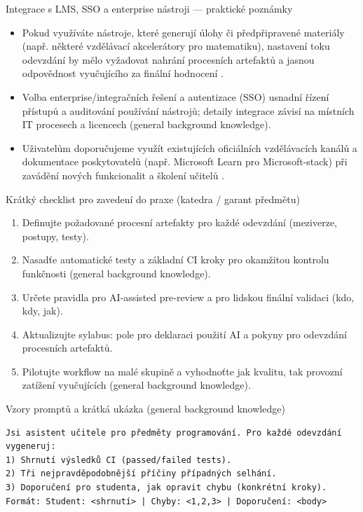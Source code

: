 \documentclass{report}%
\begin{document}
Integrace s LMS, SSO a enterprise nástroji — praktické poznámky
\begin{itemize}
  \item Pokud využíváte nástroje, které generují úlohy či předpřipravené materiály (např. některé vzdělávací akcelerátory pro matematiku), nastavení toku odevzdání by mělo vyžadovat nahrání procesních artefaktů a jasnou odpovědnost vyučujícího za finální hodnocení \cite{kb_ai_101_tipu_pdf_04e4a115_page_8_1}.
  \item Volba enterprise/integračních řešení a autentizace (SSO) usnadní řízení přístupů a auditování používání nástrojů; detaily integrace závisí na místních IT procesech a licencech (general background knowledge).
  \item Uživatelům doporučujeme využít existujících oficiálních vzdělávacích kanálů a dokumentace poskytovatelů (např. Microsoft Learn pro Microsoft‑stack) při zavádění nových funkcionalit a školení učitelů \cite{kb_ai_101_tipu_pdf_04e4a115_page_54_1}.
\end{itemize}

Krátký checklist pro zavedení do praxe (katedra / garant předmětu)
\begin{enumerate}
  \item Definujte požadované procesní artefakty pro každé odevzdání (meziverze, postupy, testy).
  \item Nasadťe automatické testy a základní CI kroky pro okamžitou kontrolu funkčnosti (general background knowledge).
  \item Určete pravidla pro AI‑assisted pre‑review a pro lidskou finální validaci (kdo, kdy, jak).
  \item Aktualizujte sylabus: pole pro deklaraci použití AI a pokyny pro odevzdání procesních artefaktů.
  \item Pilotujte workflow na malé skupině a vyhodnoťte jak kvalitu, tak provozní zatížení vyučujících (general background knowledge).
\end{enumerate}

Vzory promptů a krátká ukázka (general background knowledge)
\begin{verbatim}
Jsi asistent učitele pro předměty programování. Pro každé odevzdání vygeneruj:
1) Shrnutí výsledků CI (passed/failed tests).
2) Tři nejpravděpodobnější příčiny případných selhání.
3) Doporučení pro studenta, jak opravit chybu (konkrétní kroky).
Formát: Student: <shrnutí> | Chyby: <1,2,3> | Doporučení: <body>
\end{verbatim}
\end{document}
